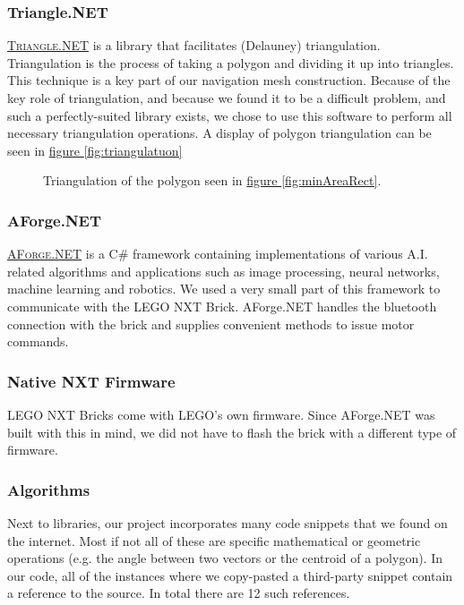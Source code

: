 \documentclass[10pt, abstracton, twocolumn]{scrartcl}
\newcommand{\fref}[1]{\hyperref[#1]{figure \vref{#1}}}
\newcommand{\link}[2]{\textsc{\href{#1}{#2}}}
\begin{document}
\subsubsection{Triangle.NET}
\link{http://triangle.codeplex.com/}{Triangle.NET} is a library that facilitates (Delauney) triangulation. Triangulation is the process of taking a polygon and dividing it up into triangles. This technique is a key part of our navigation mesh construction. Because of the key role of triangulation, and because we found it to be a difficult problem, and such a perfectly-suited library exists, we chose to use this software to perform all necessary triangulation operations. A display of polygon triangulation can be seen in \fref{fig:triangulatuon}

\begin{figure}
        \centering
        
        \caption{\small Triangulation of the polygon seen in \fref{fig:minAreaRect}.}
        \label{fig:triangulatuon}
\end{figure}

\subsubsection{AForge.NET}
\link{http://www.aforgenet.com}{AForge.NET} is a C\# framework containing implementations of various A.I. related algorithms and applications such as image processing, neural networks, machine learning and robotics. We used a very small part of this framework to communicate with the LEGO NXT Brick. AForge.NET handles the bluetooth connection with the brick and supplies convenient methods to issue motor commands.

\subsubsection{Native NXT Firmware}
LEGO NXT Bricks come with LEGO's own firmware. Since AForge.NET was built with this in mind, we did not have to flash the brick with a different type of firmware.

\subsubsection{Algorithms}
Next to libraries, our project incorporates many code snippets that we found on the internet. Most if not all of these are specific mathematical or geometric operations (e.g. the angle between two vectors or the centroid of a polygon). In our code, all of the instances where we copy-pasted a third-party snippet contain a reference to the source. In total there are 12 such references.
\end{document}

